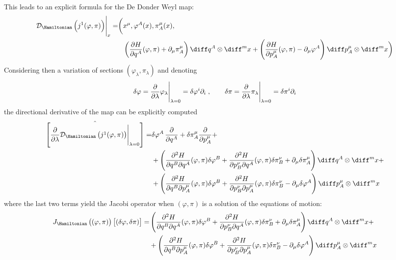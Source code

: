 \documentclass[a4paper,12pt,fleqn]{scrartcl}  %
\begin{document}
%
This leads to an explicit formula for the De Donder Weyl map:
\begin{align*}
	\eval{\mathcal{D}_\Hamiltonian \left( j^1 (\varphi, \pi) \right) }_{x} = \biggr( & 
		x^\mu, \varphi^A(x), \pi^\mu_A(x), \\
		& \left( \frac{\partial H}{\partial q^A} (\varphi,\pi) + \partial_\mu \pi^\mu_A \right)	\diff q^A \otimes \diff^m x 
			+ \left( \frac{\partial H}{\partial p^\mu_A} (\varphi,\pi) - \partial_\mu \varphi^A \right)	\diff p^\mu_A \otimes \diff^m x
		\biggr)
\end{align*}
%
Considering then a variation of sections $(\varphi_\lambda, \pi_\lambda)$ and denoting
\begin{displaymath}
	\delta \varphi = 
	\eval{ \dfrac{\partial}{\partial \lambda} \varphi_\lambda }_{ \lambda=0} =
	\delta \varphi^i \partial_i	\\
	\; , \qquad
	\delta \pi = 
	\eval{ \dfrac{\partial}{\partial \lambda} \pi_\lambda }_{ \lambda=0} =
	\delta \pi^i \partial_i
\end{displaymath}
the directional derivative of the map can be explicitly computed 
\begin{align*}
	\hat{\left[\eval{ \dfrac{\partial}{\partial \lambda} \mathcal{D}_\Hamiltonian \left( j^1 (\varphi, \pi) \right)}_{ \lambda=0} \right]}
	= &
	\delta \varphi^A \, \dfrac{\partial}{\partial q^A} + 
	\delta \pi^\mu_A \dfrac{\partial}{\partial p^\mu_A} + \\
	& + \left( 
		\frac{\partial^2 H}{\partial q^B \partial q^A} (\varphi, \pi) \delta \varphi^B +
		\frac{\partial^2 H}{\partial p^\nu_B \partial q^A} (\varphi, \pi) \delta \pi^\nu_B +
		\partial_\mu \delta \pi^\mu_A
	\right)\diff q^A  \otimes \diff^m x + \\
	& + \left( 
		\frac{\partial^2 H}{\partial q^B \partial p^\mu_A} (\varphi, \pi) \delta \varphi^B +
		\frac{\partial^2 H}{\partial p^\nu_B \partial p^\mu_A}(\varphi, \pi) \delta \pi^\nu_B -
		\partial_\mu \delta \varphi^A
	\right)\diff p^\mu_A  \otimes \diff^m x
\end{align*}
where the last two terms yield the Jacobi operator when $(\varphi,\pi)$ is a solution of the equations of motion:
\begin{align*}
	J_\Hamiltonian\left( (\varphi, \pi)\right) \left[ (\delta\varphi , \delta \pi ) \right] =
	& \left( 
		\frac{\partial^2 H}{\partial q^B \partial q^A} (\varphi, \pi) \delta \varphi^B +
		\frac{\partial^2 H}{\partial p^\nu_B \partial q^A} (\varphi, \pi) \delta \pi^\nu_B +
		\partial_\mu \delta \pi^\mu_A
	\right)\diff q^A  \otimes \diff^m x + \\
	& + \left( 
		\frac{\partial^2 H}{\partial q^B \partial p^\mu_A} (\varphi, \pi) \delta \varphi^B +
		\frac{\partial^2 H}{\partial p^\nu_B \partial p^\mu_A}(\varphi, \pi) \delta \pi^\nu_B -
		\partial_\mu \delta \varphi^A
	\right)\diff p^\mu_A  \otimes \diff^m x
\end{align*}
\end{document}
